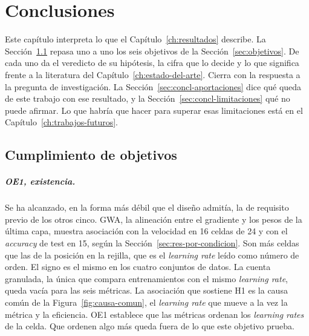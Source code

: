 \chapter{Conclusiones}
\label{ch:conclusiones}

Este capítulo interpreta lo que el Capítulo~\ref{ch:resultados} describe. La Sección~\ref{sec:concl-objetivos} repasa uno a uno los seis objetivos de la Sección~\ref{sec:objetivos}. De cada uno da el veredicto de su hipótesis, la cifra que lo decide y lo que significa frente a la literatura del Capítulo~\ref{ch:estado-del-arte}. Cierra con la respuesta a la pregunta de investigación. La Sección~\ref{sec:concl-aportaciones} dice qué queda de este trabajo con ese resultado, y la Sección~\ref{sec:concl-limitaciones} qué no puede afirmar. Lo que habría que hacer para superar esas limitaciones está en el Capítulo~\ref{ch:trabajos-futuros}.

\section{Cumplimiento de objetivos}
\label{sec:concl-objetivos}

\paragraph{OE1, existencia.} Se ha alcanzado, en la forma más débil que el diseño admitía, la de requisito previo de los otros cinco. GWA, la alineación entre el gradiente y los pesos de la última capa, muestra asociación con la velocidad en 16 celdas de 24 y con el \emph{accuracy} de test en 15, según la Sección~\ref{sec:res-por-condicion}. Son más celdas que las de la posición en la rejilla, que es el \emph{learning rate} leído como número de orden. El signo es el mismo en los cuatro conjuntos de datos. La cuenta granulada, la única que compara entrenamientos con el mismo \emph{learning rate}, queda vacía para las seis métricas. La asociación que sostiene H1 es la causa común de la Figura~\ref{fig:causa-comun}, el \emph{learning rate} que mueve a la vez la métrica y la eficiencia. OE1 establece que las métricas ordenan los \emph{learning rates} de la celda. Que ordenen algo más queda fuera de lo que este objetivo prueba.

